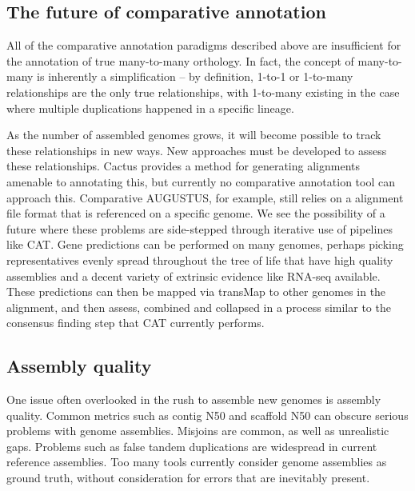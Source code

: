 \documentclass[fleqn,10pt]{wlscirep}
\begin{document}
\subsection{The future of comparative annotation}
All of the comparative annotation paradigms described above are insufficient for the annotation of true many-to-many orthology. In fact, the concept of many-to-many is inherently a simplification -- by definition, 1-to-1 or 1-to-many relationships are the only true relationships, with 1-to-many existing in the case where multiple duplications happened in a specific lineage. 

As the number of assembled genomes grows, it will become possible to track these relationships in new ways. New approaches must be developed to assess these relationships. Cactus provides a method for generating alignments amenable to annotating this, but currently no comparative annotation tool can approach this. Comparative AUGUSTUS, for example, still relies on a alignment file format that is referenced on a specific genome. We see the possibility of a future where these problems are side-stepped through iterative use of pipelines like CAT. Gene predictions can be performed on many genomes, perhaps picking representatives evenly spread throughout the tree of life that have high quality assemblies and a decent variety of extrinsic evidence like RNA-seq available. These predictions can then be mapped via transMap to other genomes in the alignment, and then assess, combined and collapsed in a process similar to the consensus finding step that CAT currently performs.

\subsection{Assembly quality}
One issue often overlooked in the rush to assemble new genomes is assembly quality. Common metrics such as contig N50 and scaffold N50 can obscure serious problems with genome assemblies. Misjoins are common, as well as unrealistic gaps. Problems such as false tandem duplications are widespread in current reference assemblies. Too many tools currently consider genome assemblies as ground truth, without consideration for errors that are inevitably present.
\end{document}
